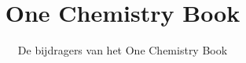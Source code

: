 \documentclass[11pt,a4paper,twoside,openany]{book}
\title{One Chemistry Book}
\author{De bijdragers van het One Chemistry Book}
\date{\bookdate}
\begin{document}
\frontmatter




\tableofcontents

\mainmatter



\appendix
\part{\omsolutionspart}


\backmatter
\printindex
\end{document}
